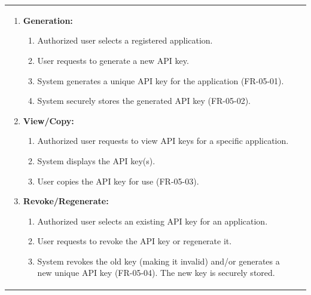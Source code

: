 \begin{minipage}{\textwidth}
\begin{tabularx}{\textwidth}{|p{}|X|}
{        \setlist[enumerate]{nosep, leftmargin=1.5em, itemsep=0pt, parsep=0pt, topsep=0pt, partopsep=0pt, after=\strut}
        \begin{enumerate}
            \item \textbf{Generation:}
                \setlist[enumerate,2]{nosep, leftmargin=1.5em, itemsep=0pt, parsep=0pt, topsep=0pt, partopsep=0pt, after=\strut}
                \begin{enumerate}
                    \item Authorized user selects a registered application.
                    \item User requests to generate a new API key.
                    \item System generates a unique API key for the application (FR-05-01).
                    \item System securely stores the generated API key (FR-05-02).
                \end{enumerate}
            \item \textbf{View/Copy:}
                 \setlist[enumerate,2]{nosep, leftmargin=1.5em, itemsep=0pt, parsep=0pt, topsep=0pt, partopsep=0pt, after=\strut}
                \begin{enumerate}
                    \item Authorized user requests to view API keys for a specific application.
                    \item System displays the API key(s).
                    \item User copies the API key for use (FR-05-03).
                \end{enumerate}
            \item \textbf{Revoke/Regenerate:}
                 \setlist[enumerate,2]{nosep, leftmargin=1.5em, itemsep=0pt, parsep=0pt, topsep=0pt, partopsep=0pt, after=\strut}
                \begin{enumerate}
                    \item Authorized user selects an existing API key for an application.
                    \item User requests to revoke the API key or regenerate it.
                    \item System revokes the old key (making it invalid) and/or generates a new unique API key (FR-05-04). The new key is securely stored.
                \end{enumerate}
        \end{enumerate}%
        } \\

\end{tabularx}
\end{minipage}
